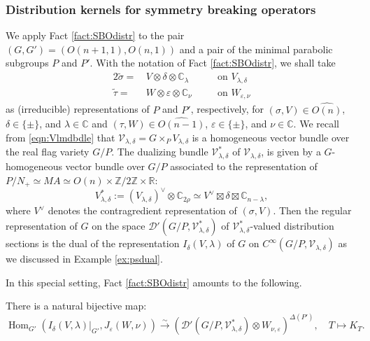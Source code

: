 \subsubsection{Distribution kernels for symmetry breaking operators}
We apply Fact \ref{fact:SBOdistr} to the pair
 $(G,G')=(O(n+1,1),O(n,1))$
 and a pair of the minimal parabolic subgroups $P$ and $P'$.  
With the notation of Fact \ref{fact:SBOdistr}, 
 we shall take
\begin{alignat*}{2}
\widetilde \sigma =\, & V \otimes \delta \otimes {\mathbb{C}}_{\lambda}
\quad
&&\text{on $V_{\lambda,\delta}$}
\\
\widetilde \tau =\, & W \otimes \varepsilon \otimes {\mathbb{C}}_{\nu}
\quad
&&\text{on $W_{\varepsilon,\nu}$}
\end{alignat*}
as (irreducible) representations of $P$ and $P'$, 
 respectively,
 for $(\sigma, V) \in \widehat{O(n)}$, 
 $\delta \in \{\pm\}$, 
 and $\lambda \in {\mathbb{C}}$
 and $(\tau, W) \in \widehat{O(n-1)}$, 
$\varepsilon \in \{\pm\}$, 
 and $\nu \in {\mathbb{C}}$.  
We recall from \eqref{eqn:Vlmdbdle}
 that 
$
{\mathcal{V}}_{\lambda, \delta}
=G \times_P V_{\lambda,\delta}
$
 is a homogeneous vector bundle over the real flag variety $G/P$.  
The dualizing bundle 
$
{\mathcal{V}}_{\lambda, \delta}^{\ast}
$
 of ${\mathcal{V}}_{\lambda, \delta}$, 
 is given by a $G$-homogeneous vector bundle over $G/P$
 associated to the representation
 of $P/N_+ \simeq MA \simeq O(n) \times {\mathbb{Z}}/2{\mathbb{Z}} \times {\mathbb{R}}$:
\[
 V_{\lambda, \delta}^{\ast}
:=(V_{\lambda,\delta})^{\vee} \otimes {\mathbb{C}}_{2\rho}
\simeq V^{\vee} \boxtimes {\delta} \boxtimes{\mathbb{C}}_{n-\lambda}, 
\]
where 
$V^{\vee}$ denotes the contragredient representation
 of $(\sigma,V)$.  
Then the regular representation
 of $G$ on the space
$
   {\mathcal{D}}'(G/P, {\mathcal{V}}_{\lambda, \delta}^{\ast})
$
 of ${\mathcal{V}}_{\lambda, \delta}^{\ast}$-valued distribution sections
 is the dual of the representation 
 $I_{\delta}(V,\lambda)$ of $G$
 on $C^{\infty}(G/P, {\mathcal{V}}_{\lambda, \delta})$
 as we discussed in Example \ref{ex:psdual}.  



In this special setting, 
 Fact \ref{fact:SBOdistr} amounts to the following.  
\begin{fact}
\label{fact:kernel}
There is a natural bijective map:
\begin{equation}
\label{eqn:ker}
\operatorname{Hom}_{G'}
  (
   I_{\delta}(V,\lambda)|_{G'}, 
   J_{\varepsilon}(W,\nu)
  )
\overset \sim \to 
   ({\mathcal{D}}'
    (G/P, {\mathcal{V}}_{\lambda, \delta}^{\ast})
    \otimes
    W_{\nu,\varepsilon}
    )
    ^{\Delta (P')}, 
\quad
   T \mapsto K_T.  
\end{equation}
\end{fact}



